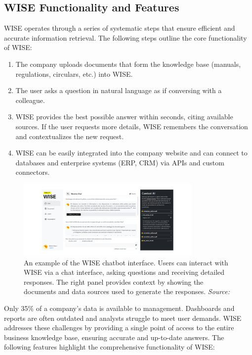 \subsection{WISE Functionality and Features}

WISE operates through a series of systematic steps that ensure efficient and accurate information retrieval. The following steps outline the core functionality of WISE:

\begin{enumerate}
    \item The company uploads documents that form the knowledge base (manuals, regulations, circulars, etc.) into WISE.
    \item The user asks a question in natural language as if conversing with a colleague.
    \item WISE provides the best possible answer within seconds, citing available sources. If the user requests more details, WISE remembers the conversation and contextualizes the new request.
    \item WISE can be easily integrated into the company website and can connect to databases and enterprise systems (ERP, CRM) via APIs and custom connectors.
\end{enumerate}

\begin{figure}[h!]
    \centering
    \includegraphics[width=0.8\textwidth]{images/wise/wise-chat-UX.png}
    \caption{An example of the WISE chatbot interface. Users can interact with WISE via a chat interface, asking questions and receiving detailed responses. The right panel provides context by showing the documents and data sources used to generate the responses. \textit{Source:} \cite{hpa2024}}
    \label{fig:wise-chat-ux}
\end{figure}

Only 35\% of a company's data is available to management. Dashboards and reports are often outdated and analysts struggle to meet user demands. WISE addresses these challenges by providing a single point of access to the entire business knowledge base, ensuring accurate and up-to-date answers. The following features highlight the comprehensive functionality of WISE:

